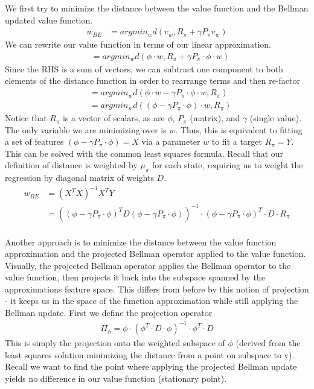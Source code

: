 \documentclass{article}
\begin{document}
We first try to minimize the distance between the value function and the Bellman updated value function.
\begin{align*}
w_{BE} & = argmin_w d(v_w, R_\pi + \gamma P_\pi v_w) 
\end{align*}
We can rewrite our value function in terms of our linear approximation. 
\begin{align*}
& = argmin_w d(\phi \cdot w, R_\pi + \gamma P_\pi \cdot \phi \cdot w) 
\end{align*}
Since the RHS is a sum of vectors, we can subtract one component to both elements of the distance function in order to rearrange terms and then re-factor
\begin{align*}
& = argmin_w d(\phi \cdot w - \gamma P_\pi \cdot \phi \cdot w, R_\pi ) \\
& = argmin_w d((\phi - \gamma P_\pi \cdot \phi) \cdot w, R_\pi ) 
\end{align*}
Notice that $R_\pi$ is a vector of scalars, as are $\phi$, $P_\pi$ (matrix), and $\gamma$ (single value). The only variable we are minimizing over is $w$. Thus, this is equivalent to fitting a set of features $(\phi - \gamma P_\pi \cdot \phi) = X$ via a parameter $w$ to fit a target $R_\pi = Y$. This can be solved with the common least squares formula. Recall that our definition of distance is weighted by $\mu_\pi$ for each state, requiring us to weight the regression by diagonal matrix of weights $D$.
\begin{align*}
w_{BE} & = (X^TX)^{-1} X^TY \\
& =  ((\phi - \gamma P_\pi \cdot \phi)^T D (\phi - \gamma P_\pi \cdot \phi))^{-1} \cdot (\phi - \gamma P_\pi \cdot \phi)^T \cdot D \cdot  R_\pi
\end{align*}
\\
Another approach is to minimize the distance between the value function approximation and the projected Bellman operator applied to the value function. Visually, the projected Bellman operator applies the Bellman operator to the value function, then projects it back into the subspace spanned by the approximations feature space. This differs from before by this notion of projection - it keeps us in the space of the function approximation while still applying the Bellman update. First we define the projection operator
\begin{align*}
\Pi_\phi = \phi \cdot (\phi^T \cdot D \cdot \phi)^{-1} \cdot \phi^T \cdot D
\end{align*}
This is simply the projection onto the weighted subspace of $\phi$ (derived from the least squares solution minimizing the distance from a point on subspace to v). Recall we want to find the point where applying the projected Bellman update yields no difference in our value function (stationary point).
\end{document}
